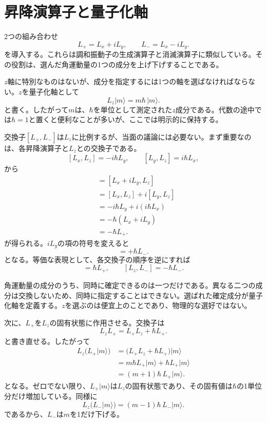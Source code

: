 \section{昇降演算子と量子化軸}

2つの組み合わせ
\begin{equation}
L_+=L_x+iL_y,
\qquad
L_-=L_x-iL_y.
\end{equation}
を導入する。これらは調和振動子の生成演算子と消滅演算子に類似している。その役割は、選んだ角運動量の1つの成分を上げ下げすることである。

\(z\)軸に特別なものはないが、成分を指定するには1つの軸を選ばなければならない。\(z\)を量子化軸として
\begin{equation}
L_z\lvert m\rangle=m\hbar\,\lvert m\rangle.
\end{equation}
と書く。したがって\(m\)は、\(\hbar\)を単位として測定された\(z\)成分である。代数の途中では\(\hbar=1\)と置くと便利なことが多いが、ここでは明示的に保持する。

交換子\([L_+,L_-]\)は\(L_z\)に比例するが、当面の議論には必要ない。まず重要なのは、各昇降演算子と\(L_z\)との交換子である。
\[
[L_x,L_z]=-i\hbar L_y,
\qquad
[L_y,L_z]=i\hbar L_x,
\]
から
\begin{align}
[L_+,L_z]
&=[L_x+iL_y,L_z] \\
&=[L_x,L_z]+i[L_y,L_z] \\
&=-i\hbar L_y+i(i\hbar L_x) \\
&=-\hbar(L_x+iL_y) \\
&=-\hbar L_+.
\end{align}
が得られる。\(iL_y\)の項の符号を変えると
\begin{equation}
[L_-,L_z]=+\hbar L_-.
\end{equation}
となる。等価な表現として、各交換子の順序を逆にすれば
\begin{equation}
[L_z,L_+]=\hbar L_+,
\qquad
[L_z,L_-]=-\hbar L_-.
\end{equation}

角運動量の成分のうち、同時に確定できるのは一つだけである。異なる二つの成分は交換しないため、同時に指定することはできない。選ばれた確定成分が量子化軸を定義する。\(z\)を選ぶのは便宜上のことであり、物理的な選好ではない。

次に、\(L_+\)を\(L_z\)の固有状態に作用させる。交換子は
\begin{equation}
L_zL_+=L_+L_z+\hbar L_+.
\end{equation}
と書き直せる。したがって
\begin{align}
L_z\bigl(L_+\lvert m\rangle\bigr)
&=\bigl(L_+L_z+\hbar L_+\bigr)\lvert m\rangle \\
&=m\hbar L_+\lvert m\rangle+\hbar L_+\lvert m\rangle \\
&=(m+1)\hbar\,L_+\lvert m\rangle.
\end{align}
となる。ゼロでない限り、\(L_+\lvert m\rangle\)は\(L_z\)の固有状態であり、その固有値は\(\hbar\)の1単位分だけ増加している。同様に
\begin{equation}
L_z\bigl(L_-\lvert m\rangle\bigr)
=(m-1)\hbar\,L_-\lvert m\rangle.
\end{equation}
であるから、\(L_-\)は\(m\)を1だけ下げる。

